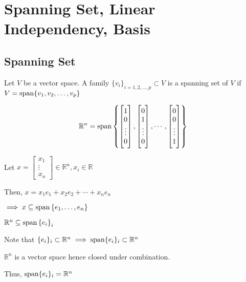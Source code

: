 \section{Spanning Set, Linear Independency, Basis}

\subsection{Spanning Set}

\begin{definition}
	Let $V$ be a vector space. A family $\{v_i\}_{i=1,2,\ldots,p} \subset V$ is a spanning set of $V$ if $V=\mathrm{span}\{v_1, v_2, \ldots, v_p\}$
\end{definition}

\begin{example}
	\begin{equation} \label{eq:span-ex-1}
		\mathbb{R}^n = \mathrm{span}\left\{\begin{bmatrix}
			1\\0\\\vdots\\0
		\end{bmatrix}, \begin{bmatrix}
			0\\1\\\vdots\\0
		\end{bmatrix}, \cdots, \begin{bmatrix}
			0\\0\\\vdots\\1
		\end{bmatrix}\right\}
	\end{equation}
\end{example}

\begin{sol}
	Let $x = \begin{bmatrix}
		x_1\\\vdots\\x_n
	\end{bmatrix} \in \mathbb{R}^n, x_i \in \mathbb{R}$

	Then, $x = x_1 e_1 + x_2 e_2 + \cdots + x_n e_n$

	$\implies x \subseteq \mathrm{span}\left\{e_1, \ldots, e_n\right\}$

	$\mathbb{R}^n \subseteq \mathrm{span}\left\{e_i\right\}_i$

	\bigskip

	Note that $\{e_i\}_i \subset \mathbb{R}^n \implies \mathrm{span}\{e_i\}_i \subset \mathbb{R}^n$

	$\mathbb{R}^n$ is a vector space hence closed under combination.

	Thus, $\mathrm{span}\{e_i\}_i = \mathbb{R}^n$
\end{sol}

